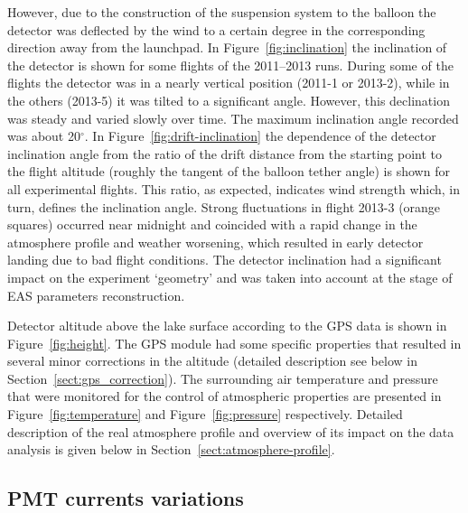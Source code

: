 \documentclass[universe,article,submit,moreauthors,pdftex]{Definitions/mdpi}
\begin{document}
However, due to the construction of the suspension system to the balloon the detector was deflected by the wind to a certain degree in the corresponding direction away from the launchpad. In Figure~\ref{fig:inclination} the inclination of the detector is shown for some flights of the 2011--2013 runs. During some of the flights the detector was in a nearly vertical position (2011-1 or 2013-2), while in the others (2013-5) it was tilted to a significant angle. However, this declination was steady and varied slowly over time. The maximum inclination angle recorded was about 20$^\circ$. In Figure~\ref{fig:drift-inclination} the dependence of the detector inclination angle from the ratio of the drift distance from the starting point to the flight altitude (roughly the tangent of the balloon tether angle) is shown for all experimental flights. This ratio, as expected, indicates wind strength which, in turn, defines the inclination angle. Strong fluctuations in flight 2013-3 (orange squares) occurred near midnight and coincided with a rapid change in the atmosphere profile and weather worsening, which resulted in early detector landing due to bad flight conditions. The detector inclination had a significant impact on the experiment `geometry' and was taken into account at the stage of EAS parameters reconstruction.

Detector altitude above the lake surface according to the GPS data is shown in Figure~\ref{fig:height}. The GPS module had some specific properties that resulted in several minor corrections in the altitude (detailed description see below in Section~\ref{sect:gps_correction}). The surrounding air temperature and pressure that were monitored for the control of atmospheric properties are presented in Figure~\ref{fig:temperature} and Figure~\ref{fig:pressure} respectively. Detailed description of the real atmosphere profile and overview of its impact on the data analysis is given below in Section~\ref{sect:atmosphere-profile}.



\subsection{PMT currents variations}
\end{document}
